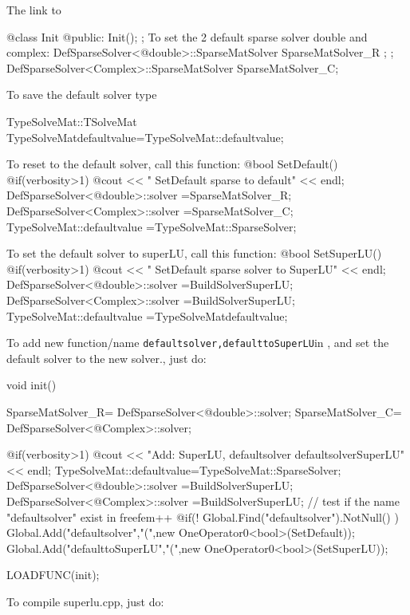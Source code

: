\documentclass[a4paper,twoside,12pt]{book}
\def\n{\nabla}
\begin{document}
\eFF

The link to \freefempp


\bFF
@class Init { @public:
    Init();
};
\eFF
  To set the  2 default sparse solver double and complex:
\bFF
DefSparseSolver<@double>::SparseMatSolver SparseMatSolver_R ; ;
DefSparseSolver<Complex>::SparseMatSolver SparseMatSolver_C;
\eFF

To save  the default solver type

\bFF
TypeSolveMat::TSolveMat  TypeSolveMatdefaultvalue=TypeSolveMat::defaultvalue;
\eFF

To reset to the default solver, call this function:
\bFF
@bool SetDefault()
{
   @if(verbosity>1)
	  @cout << " SetDefault sparse to default" << endl;
    DefSparseSolver<@double>::solver =SparseMatSolver_R;
    DefSparseSolver<Complex>::solver =SparseMatSolver_C;
    TypeSolveMat::defaultvalue =TypeSolveMat::SparseSolver;
}
\eFF

To set the default solver to superLU, call this function:
\bFF
@bool SetSuperLU()
{
    @if(verbosity>1)
	  @cout << " SetDefault sparse solver to SuperLU" << endl;
    DefSparseSolver<@double>::solver  =BuildSolverSuperLU;
    DefSparseSolver<Complex>::solver =BuildSolverSuperLU;
    TypeSolveMat::defaultvalue =TypeSolveMatdefaultvalue;
}
\eFF

To add new function/name \texttt{defaultsolver,defaulttoSuperLU}in \freefempp,
and set the default  solver to the new solver., just do:

\bFF
void init()
{

  SparseMatSolver_R= DefSparseSolver<@double>::solver;
  SparseMatSolver_C= DefSparseSolver<@Complex>::solver;

  @if(verbosity>1)
    @cout << "\n Add: SuperLU,  defaultsolver defaultsolverSuperLU" << endl;
  TypeSolveMat::defaultvalue=TypeSolveMat::SparseSolver;
  DefSparseSolver<@double>::solver =BuildSolverSuperLU;
  DefSparseSolver<@Complex>::solver =BuildSolverSuperLU;
  //  test if the name "defaultsolver" exist in freefem++
 @if(! Global.Find("defaultsolver").NotNull() )
    Global.Add("defaultsolver","(",new OneOperator0<bool>(SetDefault));
  Global.Add("defaulttoSuperLU","(",new OneOperator0<bool>(SetSuperLU));
}

LOADFUNC(init);

\eFF

To compile superlu.cpp, just do:
\end{document}
